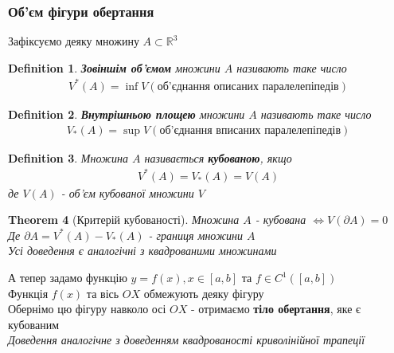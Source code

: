 \documentclass[a4paper, 14pt]{extarticle}
\theoremstyle{theoremdd}
\newtheorem{theorem}{Theorem}[subsection]
\theoremstyle{theoremdd}
\newtheorem{definition}[theorem]{Definition}
\theoremstyle{theoremdd}
\theoremstyle{theoremdd}
\theoremstyle{theoremdd}
\theoremstyle{theoremdd}
\theoremstyle{theoremdd}
\theoremstyle{theoremdd}
\begin{document}
\subsubsection{Об'єм фігури обертання}
Зафіксуємо деяку множину $A \subset \mathbb{R}^3$
\begin{definition}
\textbf{Зовіншім об'ємом} множини $A$ називають таке число
\begin{align*}
V^*(A) = \inf V(\text{об'єднання описаних паралелепіпедів})
\end{align*}
\end{definition}

\begin{definition}
\textbf{Внутрішньою площею} множини $A$ називають таке число
\begin{align*}
V_*(A) = \sup V(\text{об'єднання вписаних паралелепіпедів})
\end{align*}
\end{definition}
\begin{definition}
Множина $A$ називається \textbf{кубованою}, якщо
\begin{align*}
V^*(A) = V_*(A) = V(A)
\end{align*}
де $V(A)$ - об'єм кубованої множини $V$
\end{definition}

\begin{theorem}[Критерій кубованості]
Множина $A$ - кубована $\iff V(\partial A) = 0$\\
Де $\partial A = V^*(A) - V_*(A)$ - границя множини $A$\\
\textit{Усі доведення є аналогічні з квадрованими множинами}
\end{theorem}
А тепер задамо функцію $y = f(x), x \in [a,b]$ та $f \in C^1([a,b])$\\
Функція $f(x)$ та вісь $OX$ обмежують деяку фігуру\\
Обернімо цю фігуру навколо осі $OX$ - отримаємо \textbf{тіло обертання}, яке є кубованим\\
\textit{Доведення аналогічне з доведенням квадрованості криволінійної трапеції}
\begin{figure}[H]
\centering
{}
\qquad
{}
\end{figure}
\end{document}
